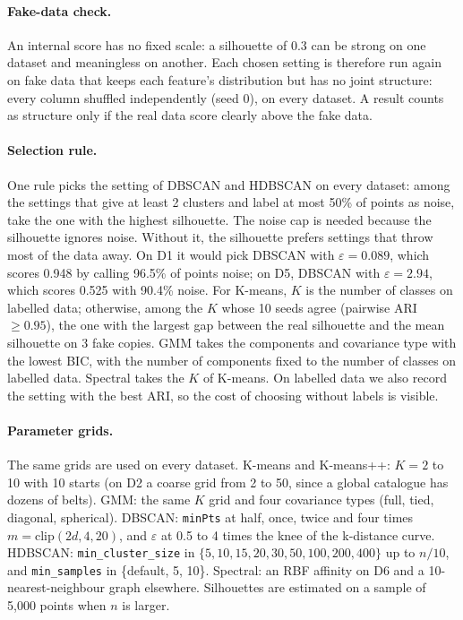 \paragraph{Fake-data check.}
An internal score has no fixed scale: a silhouette of 0.3 can be strong on one dataset and meaningless on
another. Each chosen setting is therefore run again on fake data that keeps each feature's distribution but
has no joint structure: every column shuffled independently (seed 0), on every dataset. A result counts
as structure only if the real data score clearly above the fake data.

\paragraph{Selection rule.}
One rule picks the setting of DBSCAN and HDBSCAN on every dataset: among the settings that give at least
2 clusters and label at most 50\% of points as noise, take the one with the highest silhouette. The noise
cap is needed because the silhouette ignores noise. Without it, the silhouette prefers settings that throw
most of the data away. On D1 it would pick DBSCAN with $\varepsilon=0.089$, which scores 0.948 by calling
96.5\% of points noise; on D5, DBSCAN with $\varepsilon=2.94$, which scores 0.525 with 90.4\% noise.
For K-means, $K$ is the number of classes on labelled data; otherwise, among the $K$ whose 10 seeds agree
(pairwise ARI $\geq0.95$), the one with the largest gap between the real silhouette and the mean
silhouette on 3 fake copies. GMM takes the components and covariance type with the lowest BIC, with the
number of components fixed to the number of classes on labelled data. Spectral takes the $K$ of K-means.
On labelled data we also record the setting with the best ARI, so the cost of choosing without labels is
visible.

\paragraph{Parameter grids.}
The same grids are used on every dataset. K-means and K-means++: $K=2$ to 10 with 10 starts (on D2 a
coarse grid from 2 to 50, since a global catalogue has dozens of belts). GMM: the same $K$ grid and four
covariance types (full, tied, diagonal, spherical). DBSCAN: \texttt{minPts} at half, once, twice and four
times $m=\mathrm{clip}(2d,4,20)$, and $\varepsilon$ at 0.5 to 4 times the knee of the k-distance curve.
HDBSCAN: \texttt{min\_cluster\_size} in $\{5,10,15,20,30,50,100,200,400\}$ up to $n/10$, and
\texttt{min\_samples} in \{default, 5, 10\}. Spectral: an RBF affinity on D6 and a 10-nearest-neighbour
graph elsewhere. Silhouettes are estimated on a sample of 5{,}000 points when $n$ is larger.

